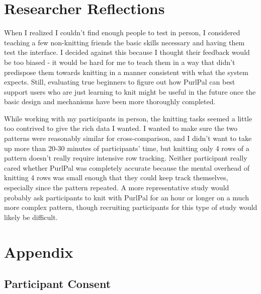 \documentclass{article}
\begin{document}
\section{Researcher Reflections}

When I realized I couldn't find enough people to test in person, I considered teaching a few non-knitting friends the basic skills necessary and having them test the interface.
I decided against this because I thought their feedback would be too biased - it would be hard for me to teach them in a way that didn't predispose them towards knitting in a manner consistent with what the system expects.
Still, evaluating true beginners to figure out how PurlPal can best support users who are just learning to knit might be useful in the future once the basic design and mechanisms have been more thoroughly completed.

While working with my participants in person, the knitting tasks seemed a little too contrived to give the rich data I wanted.
I wanted to make sure the two patterns were reasonably similar for cross-comparison, and I didn't want to take up more than 20-30 minutes of participants' time, but knitting only 4 rows of a pattern doesn't really require intensive row tracking.
Neither participant really cared whether PurlPal was completely accurate because the mental overhead of knitting 4 rows was small enough that they could keep track themselves, especially since the pattern repeated.
A more representative study would probably ask participants to knit with PurlPal for an hour or longer on a much more complex pattern, though recruiting participants for this type of study would likely be difficult.

\section{Appendix}

\subsection{Participant Consent} \label{consent}
\end{document}
